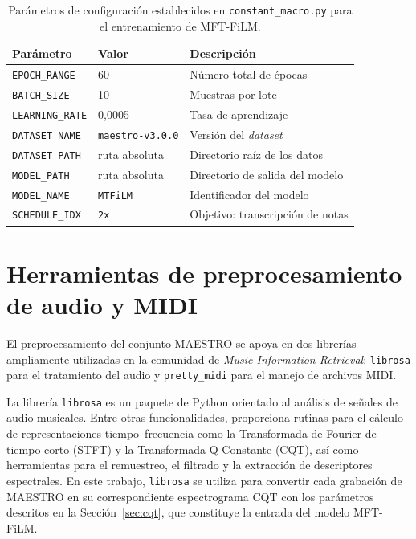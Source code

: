\documentclass[11pt,spanish,listoffigures,listoftables]{tfgetsinf}
\begin{document}
\begin{table}[H]
  \centering
  \caption[Parámetros de configuración establecidos
  para el entrenamiento de MFT-FiLM]{Parámetros de configuración establecidos en \texttt{constant\_macro.py}
  para el entrenamiento de MFT-FiLM.}
  \label{tab:config}
  \begin{tabular}{lll}
    \hline
    \textbf{Parámetro} & \textbf{Valor} & \textbf{Descripción} \\
    \hline
    \texttt{EPOCH\_RANGE}   & 60                     & Número total de épocas \\
    \texttt{BATCH\_SIZE}    & 10                     & Muestras por lote \\
    \texttt{LEARNING\_RATE} & 0{,}0005               & Tasa de aprendizaje \\
    \texttt{DATASET\_NAME}  & \texttt{maestro-v3.0.0} & Versión del \textit{dataset} \\
    \texttt{DATASET\_PATH}  & ruta absoluta          & Directorio raíz de los datos \\
    \texttt{MODEL\_PATH}    & ruta absoluta          & Directorio de salida del modelo \\
    \texttt{MODEL\_NAME}    & \texttt{MTFiLM}        & Identificador del modelo \\
    \texttt{SCHEDULE\_IDX}  & \texttt{2x}            & Objetivo: transcripción de notas \\
    \hline
  \end{tabular}
\end{table}

\section{Herramientas de preprocesamiento de audio y MIDI}
\label{anx:mft_libs}

El preprocesamiento del conjunto MAESTRO se apoya en dos librerías ampliamente
utilizadas en la comunidad de \textit{Music Information Retrieval}:
\texttt{librosa} para el tratamiento del audio y \texttt{pretty\_midi} para el
manejo de archivos MIDI.

La librería \texttt{librosa} es un paquete de Python orientado al análisis de
señales de audio musicales. Entre otras funcionalidades, proporciona rutinas
para el cálculo de representaciones tiempo--frecuencia como la Transformada de
Fourier de tiempo corto (STFT) y la Transformada Q Constante (CQT), así como
herramientas para el remuestreo, el filtrado y la extracción de descriptores
espectrales. En este trabajo, \texttt{librosa} se utiliza para convertir cada
grabación de MAESTRO en su correspondiente espectrograma CQT con los parámetros
descritos en la Sección~\ref{sec:cqt}, que constituye la entrada del modelo
MFT-FiLM.
\end{document}
